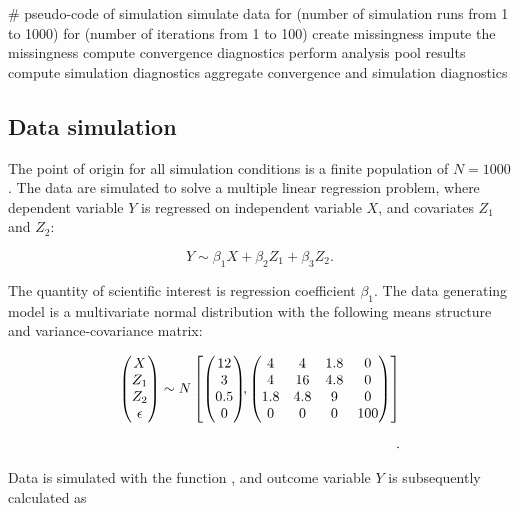 \documentclass[article]{jss}
\newcommand{\fct}[1]{\code{#1()}}
\begin{document}
\begin{Code}
# pseudo-code of simulation 
simulate data 
for (number of simulation runs from 1 to 1000)
  for (number of iterations from 1 to 100)
    create missingness
    impute the missingness
    compute convergence diagnostics
    perform analysis
    pool results
    compute simulation diagnostics
aggregate convergence and simulation diagnostics
\end{Code}

\subsection{Data simulation}
The point of origin for all simulation conditions is a finite population of $N=1000$. The data are simulated to solve a multiple linear regression problem, where dependent variable $Y$ is regressed on independent variable $X$, and covariates $Z_1$ and $Z_2$: 

$$Y \sim \beta_1 X + \beta_2 Z_1 + \beta_3 Z_2.$$

The quantity of scientific interest is regression coefficient $\beta_1$. The data generating model is a multivariate normal distribution with the following means structure and variance-covariance matrix: 

\begin{align*}
\begin{pmatrix}X\\
Z_{1}\\
Z_{2}\\
\epsilon
\end{pmatrix} \sim  N
\begin{bmatrix}
\begin{pmatrix}
12\\
3\\
0.5\\
0
\end{pmatrix}\!\!,
\begin{pmatrix}
4 & 4 & 1.8 & 0\\
4 & 16 & 4.8 & 0\\
1.8 & 4.8 & 9 & 0\\
0 & 0 & 0 & 100
\end{pmatrix}
\end{bmatrix}\\[2\jot].
\end{align*}

Data is simulated with the function \fct{mvtnorm::rmvnorm}, and outcome variable $Y$ is subsequently calculated as 
\end{document}
